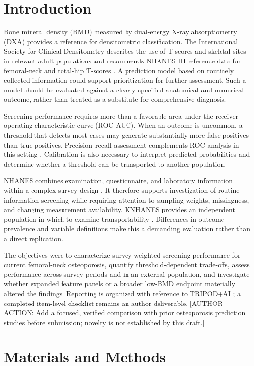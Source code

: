 \documentclass[11pt,a4paper]{article}
\newcommand{\pending}[1]{\textcolor{red!65!black}{[AUTHOR ACTION: #1]}}
\begin{document}
\section{Introduction}
Bone mineral density (BMD) measured by dual-energy X-ray absorptiometry (DXA) provides a reference for densitometric classification. The International Society for Clinical Densitometry describes the use of T-scores and skeletal sites in relevant adult populations and recommends NHANES III reference data for femoral-neck and total-hip T-scores \cite{iscd}. A prediction model based on routinely collected information could support prioritization for further assessment. Such a model should be evaluated against a clearly specified anatomical and numerical outcome, rather than treated as a substitute for comprehensive diagnosis.

Screening performance requires more than a favorable area under the receiver operating characteristic curve (ROC-AUC). When an outcome is uncommon, a threshold that detects most cases may generate substantially more false positives than true positives. Precision--recall assessment complements ROC analysis in this setting \cite{saito}. Calibration is also necessary to interpret predicted probabilities and determine whether a threshold can be transported to another population.

NHANES combines examination, questionnaire, and laboratory information within a complex survey design \cite{nhanes}. It therefore supports investigation of routine-information screening while requiring attention to sampling weights, missingness, and changing measurement availability. KNHANES provides an independent population in which to examine transportability \cite{kweon}. Differences in outcome prevalence and variable definitions make this a demanding evaluation rather than a direct replication.

The objectives were to characterize survey-weighted screening performance for current femoral-neck osteoporosis, quantify threshold-dependent trade-offs, assess performance across survey periods and in an external population, and investigate whether expanded feature panels or a broader low-BMD endpoint materially altered the findings. Reporting is organized with reference to TRIPOD+AI \cite{tripod}; a completed item-level checklist remains an author deliverable. \pending{Add a focused, verified comparison with prior osteoporosis prediction studies before submission; novelty is not established by this draft.}

\section{Materials and Methods}
\end{document}
